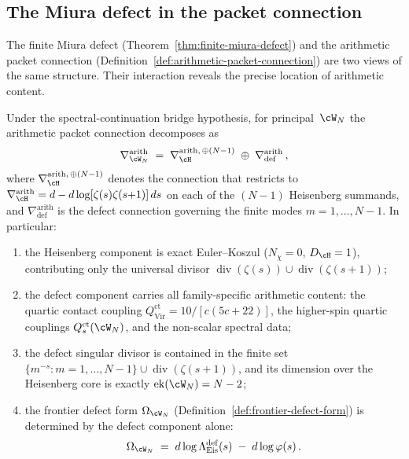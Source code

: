 \subsection{The Miura defect in the packet connection}%
\label{sec:miura-packet-bridge}%
%

The finite Miura defect
(Theorem~\ref{thm:finite-miura-defect})
and the arithmetic packet connection
(Definition~\ref{def:arithmetic-packet-connection})
are two views of the same structure.
Their interaction reveals the precise location of
arithmetic content.

\begin{proposition}[\ClaimStatusProvedHere]%
\label{prop:miura-packet-splitting}%
%
Under the spectral-continuation bridge hypothesis, for principal~$\cW_N$
the arithmetic packet connection
decomposes as
\begin{equation}\label{eq:miura-packet-splitting}
\nabla_{\cW_N}^{\mathrm{arith}}
\;=\;
\nabla_\cH^{\mathrm{arith},\,\oplus(N-1)}
\;\oplus\;
\nabla_{\mathrm{def}}^{\mathrm{arith}}\,,
\end{equation}
where $\nabla_\cH^{\mathrm{arith},\,\oplus(N-1)}$ denotes the
connection that restricts to $\nabla_\cH^{\mathrm{arith}}
= d - d\log[\zeta(s)\zeta(s{+}1)]\,ds$ on each of the
$(N{-}1)$ Heisenberg summands, and
$\nabla_{\mathrm{def}}^{\mathrm{arith}}$ is the defect
connection governing the finite modes
$m = 1,\ldots,N{-}1$.
In particular:
\begin{enumerate}[label=\textup{(\roman*)}]
\item the Heisenberg component is exact Euler--Koszul
 \textup{(}$N_\chi = 0$, $D_\cH = 1$\textup{)}, contributing
 only the universal divisor $\operatorname{div}(\zeta(s))
 \cup \operatorname{div}(\zeta(s{+}1))$\textup;
\item the defect component carries all family-specific
 arithmetic content:
 the quartic contact coupling
 $Q_{\mathrm{Vir}}^{\mathrm{ct}} = 10/[c(5c{+}22)]$,
 the higher-spin quartic couplings
 $Q_s^{\mathrm{ct}}(\cW_N)$, and the
 non-scalar spectral data\textup;
\item the defect singular divisor is contained in the
 finite set
 $\{m^{-s} : m = 1,\ldots,N{-}1\} \cup
 \operatorname{div}(\zeta(s{+}1))$,
 and its dimension over the Heisenberg core is
 exactly $\operatorname{ek}(\cW_N) = N - 2$\textup;
\item the frontier defect form
 $\Omega_{\cW_N}$
 \textup{(}Definition~\textup{\ref{def:frontier-defect-form}}\textup{)}
 is determined by the defect component alone:
 \begin{equation}\label{eq:frontier-from-defect}
 \Omega_{\cW_N}
 \;=\;
 d\log\Lambda_{\mathrm{Eis}}^{\mathrm{def}}(s)
 \;-\;
 d\log\varphi(s)\,.
 \end{equation}
\end{enumerate}
\end{proposition}

